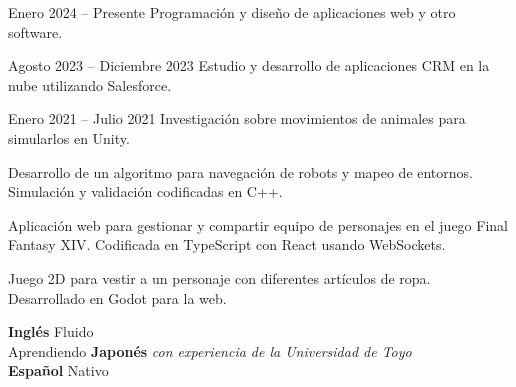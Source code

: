 \documentclass[a4paper,11pt]{memoir} %
\begin{document}
\userinformation %

\framebreak %


\heading{\fullname} %



\Sep


{Enero 2024 -- Presente}
{Programación y diseño de aplicaciones web y otro software.}

{Agosto 2023 -- Diciembre 2023}
{Estudio y desarrollo de aplicaciones CRM en la nube utilizando Salesforce.}

{Enero 2021 -- Julio 2021}
{Investigación sobre movimientos de animales para simularlos en Unity.}

\Sep


{}
{Desarrollo de un algoritmo para navegación de robots y mapeo de entornos. Simulación y validación codificadas en C++.}

{}
{Aplicación web para gestionar y compartir equipo de personajes en el juego Final Fantasy XIV. Codificada en TypeScript con React usando WebSockets.}

{}
{Juego 2D para vestir a un personaje con diferentes artículos de ropa. Desarrollado en Godot para la web.}

\Sep


\techtable

\Sep


\bluebullet \textbf{Inglés} Fluido \\
\bluebullet Aprendiendo \textbf{Japonés} \textit{con experiencia de la Universidad de Toyo} \\
\bluebullet \textbf{Español} Nativo \\
\end{document}
